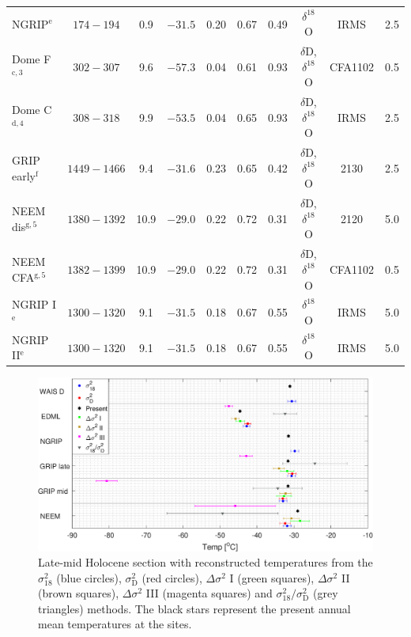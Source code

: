 \documentclass[11pt, draftcls, onecolumn]{IEEEtran} %
\numberwithin{equation}{section}
\numberwithin{table}{section}
\numberwithin{figure}{section}
\begin{document}
\begin{table}
\begin{tabular}{l c c c c c c c c c}
		NGRIP$^\mathrm{e}$ &$174-194$ &0.9 &$-31.5$ & 0.20 & 0.67  & 0.49& $\delta^{18}$O&IRMS&2.5\\			
		Dome F$^\mathrm{c,3}$& $302-307$& 9.6 & $-57.3$ &0.04 & 0.61  &  0.93 &$\delta$D, $\delta^{18}$O&CFA1102&0.5\\
		Dome C$^\mathrm{d,4}$ &$308-318$ & 9.9 &$-53.5 $ &0.04 & 0.65 &   0.93&$\delta$D, $\delta^{18}$O&IRMS&2.5\\
		GRIP early$^\mathrm{f}$&$1449-1466$ & 9.4 &$-31.6 $ & 0.23 & 0.65  &  0.42&$\delta$D, $\delta^{18}$O&2130&2.5\\
		NEEM dis$^\mathrm{g,5}$ &$1380-1392 $&10.9 &$-29.0$ & 0.22 &  0.72 &  0.31&$\delta$D, $\delta^{18}$O&2120&5.0\\       
		NEEM CFA$^\mathrm{g,5}$& $1382-1399$& 10.9 &$-29.0 $& 0.22 & 0.72  & 0.31&$\delta$D, $\delta^{18}$O&CFA1102&0.5\\			
		NGRIP I$^\mathrm{e}$&$1300-1320$ &9.1 &$-31.5$ & 0.18 & 0.67  & 0.55& $\delta^{18}$O&IRMS&5.0\\			
		NGRIP II$^\mathrm{e}$ &$1300-1320$ & 9.1 &$-31.5$ & 0.18 & 0.67  & 0.55&$\delta^{18}$O&IRMS&5.0\\				
		\bottomrule	
	\end{tabular}
\end{table}


\begin{figure}[]
	\vspace*{2mm}
	\begin{center}
		\includegraphics[width=\textwidth]{Figure_11}
		\caption{Late-mid Holocene section with reconstructed temperatures from the $\sigma^2_{18}$ (blue circles), 
			$\sigma^2_{\mathrm{D}}$ (red circles), $\Delta\sigma^2$ I (green squares),
			$\Delta\sigma^2$ II (brown squares), $\Delta\sigma^2$ III (magenta squares) and
			${\sigma^2_{18}}/{\sigma^2_\mathrm{D}}$ (grey triangles) methods.
			The black stars represent the present annual mean temperatures at the sites.}  \label{fig:all_temps}
	\end{center}
\end{figure}
\end{document}
